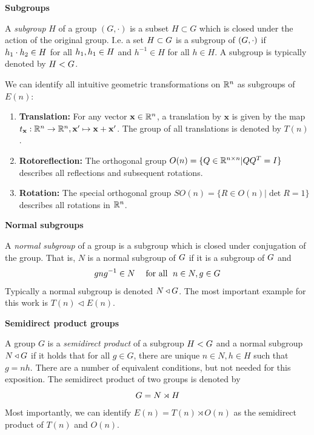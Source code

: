 \textbf{Subgroups}

A \textit{subgroup} $H$ of a group $(G,\cdot)$ is a subset $H\subset G$ which is closed under the action of the original group.
I.e. a set $H\subset G$ is a subgroup of $(G, \cdot)$ if $h_1 \cdot h_2\in H$ for all $h_1, h_1 \in H$ and $h^{-1}\in H$ for all $h\in H$.
A subgroup is typically denoted by $H < G$.

We can identify all intuitive geometric transformations on $\mathbb{R}^n$ as subgroups of $E(n)$: \begin{enumerate} \item \textbf{Translation:} For any vector $\mathbf{x}\in\mathbb{R}^n$, a translation by $\mathbf{x}$ is given by the map $t_\mathbf{x}:\mathbb{R}^n\to\mathbb{R}^n,\mathbf{x}'\mapsto \mathbf{x}+\mathbf{x}'$.
	      The group of all translations is denoted by $T(n)$ .
	\item \textbf{Rotoreflection:}
	      The orthogonal group $O(n)=\{Q\in\mathbb{R}^{n\times n}| QQ^T=I\}$ describes all reflections and subsequent rotations.
	\item \textbf{Rotation:}
	      The special orthogonal group $SO(n)=\{R\in O(n)| \det R=1\}$ describes all rotations in $\mathbb{R}^n$.
\end{enumerate}

\textbf{Normal subgroups}

A \textit{normal subgroup} of a group is a subgroup which is closed under conjugation of the group.
That is, $N$ is a normal subgroup of $G$ if it is a subgroup of $G$ and \begin{equation*} gng^{-1} \in N \; \quad\text{for all }\; n \in N, g \in G \end{equation*} Typically a normal subgroup is denoted $N \triangleleft G$.
The most important example for this work is $T(n)\triangleleft E(n)$.

\newpage
\textbf{Semidirect product groups}
\hypertarget{def:semidicrectproduct}{}

A group $G$ is a \textit{semidirect product} of a subgroup $H<G$ and a normal subgroup $N\triangleleft G$ if it holds that for all $g\in G$, there are unique $n\in N,h\in H$ such that $g=nh$.
There are a number of equivalent conditions, but not needed for this exposition.
The semidirect product of two groups is denoted by \begin{equation*} G = N \rtimes H \end{equation*} Most importantly, we can identify $E(n)=T(n)\rtimes O(n)$ as the semidirect product of $T(n)$ and $O(n)$.

